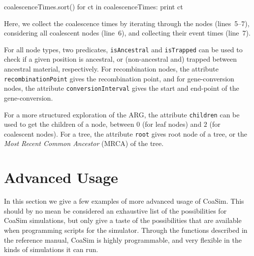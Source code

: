 \documentclass{manual}
\begin{document}
\begin{empfile}
\begin{ncode}
coalescenceTimes.sort()
for ct in coalescenceTimes:
    print ct
\end{ncode}
Here, we collect the coalescence times by iterating through the nodes
(lines~5--7), considering all coalescent nodes (line~6), and
collecting their event times (line~7).

For all node types, two predicates, \texttt{isAncestral} and
\texttt{isTrapped} can be used to check if a given position is
ancestral, or (non-ancestral and) trapped between ancestral material,
respectively.  For recombination nodes, the attribute
\texttt{recombinationPoint} gives the recombination point, and for
gene-conversion nodes, the attribute \texttt{conversionInterval} gives
the start and end-point of the gene-conversion.

For a more structured exploration of the ARG, the attribute
\texttt{children} can be used to get the children of a node, between
$0$ (for leaf nodes) and $2$ (for coalescent nodes).  For a tree, the
attribute \texttt{root} gives root node of a tree, or the \emph{Most
  Recent Common Ancestor} (MRCA) of the tree.


\section{Advanced Usage}
\label{sec:advanced-usage}

In this section we give a few examples of more advanced usage of
CoaSim.  This should by no mean be considered an exhaustive list of
the possibilities for CoaSim simulations, but only give a taste of the
possibilities that are available when programming scripts for the
simulator.  Through the functions described in the reference manual,
CoaSim is highly programmable, and very flexible in the kinds of
simulations it can run.



\end{empfile}
\end{document}

